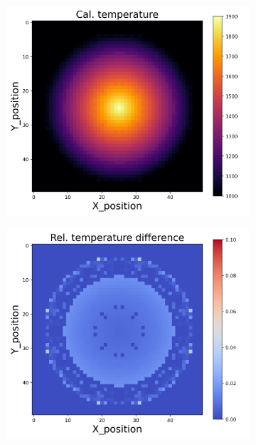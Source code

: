 \begin{figure}[htbp]
    \centering
    \begin{minipage}{\textwidth}
        \centering
        \begin{subfigure}{0.325\textwidth}
            \centering
            \includegraphics[width=\textwidth]{figures/raw_data/0/mix/T_cal.jpg}
        \end{subfigure}
        \begin{subfigure}{0.325\textwidth}
            \centering
            \includegraphics[width=\textwidth]{figures/raw_data/0/mix/T_bias.jpg}

\end{subfigure}
\end{minipage}
\end{figure}
